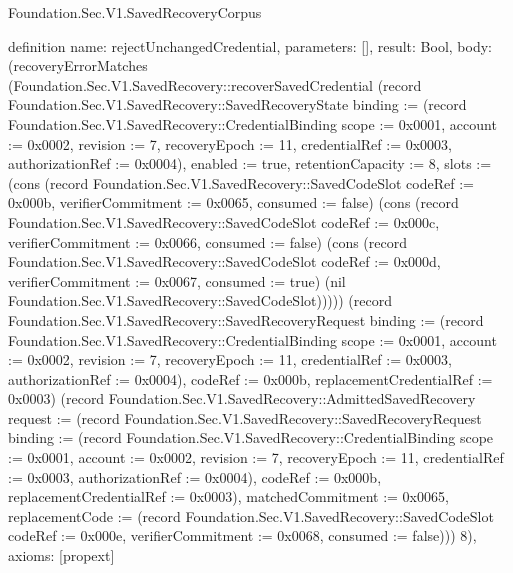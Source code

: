 \begin{lexlean}{Foundation.Sec.V1.SavedRecoveryCorpus}
\begin{semanticmodule}
definition{
  name: rejectUnchangedCredential,
  parameters: [],
  result: Bool,
  body: (recoveryErrorMatches (Foundation.Sec.V1.SavedRecovery::recoverSavedCredential (record Foundation.Sec.V1.SavedRecovery::SavedRecoveryState {binding := (record Foundation.Sec.V1.SavedRecovery::CredentialBinding {scope := 0x0001, account := 0x0002, revision := 7, recoveryEpoch := 11, credentialRef := 0x0003, authorizationRef := 0x0004}), enabled := true, retentionCapacity := 8, slots := (cons (record Foundation.Sec.V1.SavedRecovery::SavedCodeSlot {codeRef := 0x000b, verifierCommitment := 0x0065, consumed := false}) (cons (record Foundation.Sec.V1.SavedRecovery::SavedCodeSlot {codeRef := 0x000c, verifierCommitment := 0x0066, consumed := false}) (cons (record Foundation.Sec.V1.SavedRecovery::SavedCodeSlot {codeRef := 0x000d, verifierCommitment := 0x0067, consumed := true}) (nil Foundation.Sec.V1.SavedRecovery::SavedCodeSlot))))}) (record Foundation.Sec.V1.SavedRecovery::SavedRecoveryRequest {binding := (record Foundation.Sec.V1.SavedRecovery::CredentialBinding {scope := 0x0001, account := 0x0002, revision := 7, recoveryEpoch := 11, credentialRef := 0x0003, authorizationRef := 0x0004}), codeRef := 0x000b, replacementCredentialRef := 0x0003}) (record Foundation.Sec.V1.SavedRecovery::AdmittedSavedRecovery {request := (record Foundation.Sec.V1.SavedRecovery::SavedRecoveryRequest {binding := (record Foundation.Sec.V1.SavedRecovery::CredentialBinding {scope := 0x0001, account := 0x0002, revision := 7, recoveryEpoch := 11, credentialRef := 0x0003, authorizationRef := 0x0004}), codeRef := 0x000b, replacementCredentialRef := 0x0003}), matchedCommitment := 0x0065, replacementCode := (record Foundation.Sec.V1.SavedRecovery::SavedCodeSlot {codeRef := 0x000e, verifierCommitment := 0x0068, consumed := false})})) 8),
  axioms: [propext]
}


\end{semanticmodule}
\end{lexlean}
